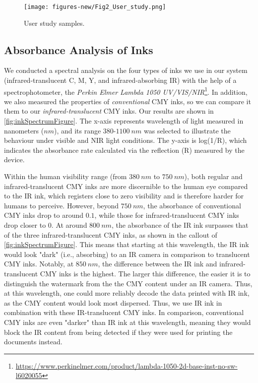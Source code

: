 \begin{figure*}[]
  \centering
  \texttt{[image: figures-new/Fig2\_User\_study.png]}
  \caption{User study samples.}
  \label{fig:userStudyFigure}
\end{figure*}



\subsection{Absorbance Analysis of Inks}
\label{spectrum}
We conducted a spectral analysis on the four types of inks we use in our system (infrared-translucent C, M, Y, and infrared-absorbing IR)  with the help of a spectrophotometer, the \textit{Perkin Elmer Lambda 1050 UV/VIS/NIR}\footnote{\url{https://www.perkinelmer.com/product/lambda-1050-2d-base-inst-no-sw-l6020055}}.
In addition, we also measured the properties of \textit{conventional} CMY inks, so we can compare it them to our \textit{infrared-translucent} CMY inks. Our results are shown in \autoref{fig:inkSpectrumFigure}.
The x-axis represents wavelength of light measured in nanometers ($nm$), and its range $380$-$1100~nm$ was selected to illustrate the behaviour under visible and NIR light conditions.
The y-axis is log(1/R), which indicates the absorbance rate calculated via the reflection (R) measured by the device.



Within the human visibility range (from $380~nm$ to $750~nm$), both regular and infrared-translucent CMY inks are more discernible to the human eye compared to the IR ink, which registers close to zero visibility and is therefore harder for humans to perceive. However, beyond $750~nm$, the absorbance of conventional CMY inks drop to around $0.1$, while those for infrared-translucent CMY inks drop closer to $0$. At around $800~nm$, the absorbance of the IR ink surpasses that of the three infrared-translucent CMY inks, as shown in the callout of \autoref{fig:inkSpectrumFigure}. 
This means that starting at this wavelength, the IR ink would look "dark" (i.e., absorbing) to an IR camera in comparison to translucent CMY inks.
Notably, at $850~nm$, the difference between the IR ink and infrared-translucent CMY inks is the highest.
The larger this difference, the easier it is to distinguish the watermark from the the CMY content under an IR camera.
Thus, at this wavelength, one could more reliably decode the data printed with IR ink, as the CMY content would look most dispersed.
Thus, we use IR ink in combination with these IR-translucent CMY inks.
In comparison, conventional CMY inks are even "darker" than IR ink at this wavelength, meaning they would block the IR content from being detected if they were used for printing the documents instead.

